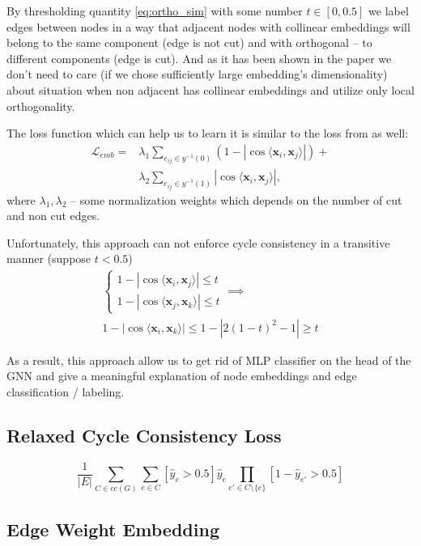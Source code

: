 \documentclass[10pt, twocolumn, a4paper]{article}
\theoremstyle{definition}
\begin{document}
By thresholding quantity \eqref{eq:ortho_sim} with some number $t \in [0, 0.5]$ we label edges between nodes
in a way that adjacent nodes with collinear embeddings will belong to the same component (edge is not cut)
and with orthogonal -- to different components (edge is cut). And as it has been shown in the
paper we don't need to care (if we chose sufficiently large embedding's dimensionality)
about situation when non adjacent has collinear embeddings and utilize only local orthogonality.

The loss function which can help us to learn it is similar to the loss from \citet{chen2019instance} as well:
\begin{align} \label{eq:ortho_loss}
    \mathcal{L}_{emb} =
     & \lambda_1 \sum\limits_{e_{ij} \in y^{-1}(0)} \left(1 - |\cos \langle \mathbf{x}_i, \mathbf{x}_j \rangle| \right) + \\
     & \lambda_2 \sum\limits_{e_{ij} \in y^{-1}(1)} |\cos \langle \mathbf{x}_i, \mathbf{x}_j \rangle|,
\end{align}
where $\lambda_1, \lambda_2$ -- some normalization weights which depends on the number of cut and non cut edges.

Unfortunately, this approach can not enforce cycle consistency in a transitive manner
(suppose $t < 0.5$)
\begin{multline*}
    \begin{cases}
        1 - |\cos \langle \mathbf{x}_i, \mathbf{x}_j \rangle| \leq t \\
        1 - |\cos \langle \mathbf{x}_j, \mathbf{x}_k \rangle| \leq t
    \end{cases} \implies \\
    1 - |\cos \langle \mathbf{x}_i, \mathbf{x}_k \rangle| \leq
    1 - |2(1 - t)^2 - 1| \geq t
\end{multline*}

As a result, this approach allow us to get rid of MLP classifier on the head of the GNN and give a
meaningful explanation of node embeddings and edge classification / labeling.

\subsection{Relaxed Cycle Consistency Loss}
\[
    \frac{1}{|E|}
    \sum\limits_{C \in cc(G)} \sum\limits_{e \in C}
    \left[\hat{y}_e > 0.5 \right] \hat{y}_e
    \prod\limits_{e' \in C \setminus \{e\}}
    \left[ 1 - \hat{y}_{e'} > 0.5 \right]
\]

\subsection{Edge Weight Embedding}
\end{document}
